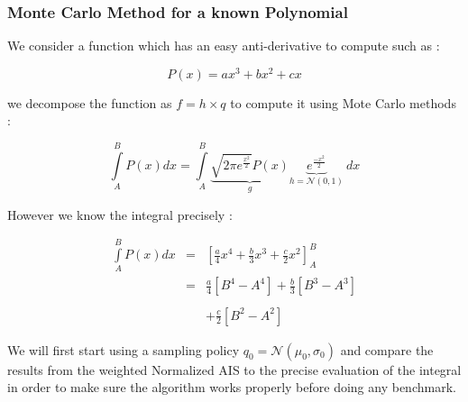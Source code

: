 
\subsubsection{Monte Carlo Method for a known Polynomial}


We consider a function which has an easy anti-derivative to compute such as :


$$P(x) = ax^3 + b x^2 + c x$$

we decompose the function as $f = h \times q $ to compute it using Mote Carlo methods :

$$\displaystyle\int\limits_A^B P(x)dx = \displaystyle\int\limits_A^B \underbrace{\sqrt{2\pi e^{\frac{x^2} 2}}P(x)}_{g} \underbrace{e^{\frac{-x^2} 2}}_{h = \mathcal N(0,1)} \ dx$$

However we know the integral precisely :

$$
\begin{array}{rcl}
\displaystyle\int\limits_A^B P(x)dx 
&=& 
\left[ \frac a 4  x^4 + \frac b 3  x^3 + \frac c 2  x^2 \right]^B_A \\
&=& \frac a 4 \left[ B^4 - A^4 \right] + \frac b 3 \left[ B^3 - A^3 \right] 
\\ & &
\\ & &+ \frac c 2 \left[ B^2 - A^2 \right]
\end{array}
$$

We will first start using a sampling policy $q_0 = \mathcal{N}(\mu_0, \sigma_0)$ and compare the results from the weighted Normalized AIS to the precise evaluation of the integral in order to make sure the algorithm works properly before doing any benchmark.
